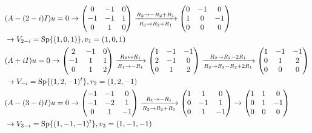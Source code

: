 \begin{align*}
	& (A - (2 - i) I) u = 0
	\rightarrow
	\begin{pmatrix}
		0 & -1 & 0 \\
		-1 & -1 & 1 \\
		0 & 1 & 0
	\end{pmatrix}
	\xrightarrow[R_3 \to R_3 + R_1]{R_2 \to -R_2 + R_1}
	\begin{pmatrix}
		0 & -1 & 0 \\
		1 & 0 & -1 \\
		0 & 0 & 0
	\end{pmatrix} \\
	& \rightarrow
	V_{2 -i} = \operatorname{Sp} \{ (1, 0, 1) \}, v_1 = (1, 0, 1) \\
	& (A + i I) u = 0
	\rightarrow
	\begin{pmatrix}
		2 & -1 & 0 \\
		-1 & 1 & 1 \\
		0 & 1 & 2
	\end{pmatrix}
	\xrightarrow[R_1 \to -R_1]{R_2 \leftrightarrow R_1}
	\begin{pmatrix}
		1 & -1 & -1 \\
		2 & -1 & 0 \\
		0 & 1 & 2
	\end{pmatrix}
	\xrightarrow[R_3 \to R_3 - R_2 + 2R_1]{R_2 \to R_2 - 2R_1}
	\begin{pmatrix}
		1 & -1 & -1 \\
		0 & 1 & 2 \\
		0 & 0 & 0
	\end{pmatrix} \\
	& \rightarrow
	V_{-i} = \operatorname{Sp}\{ (1, 2, -1)^t \}, v_2 = (1, 2, -1) \\
	& (A - (3 - i) I) u = 0
	\rightarrow
	\begin{pmatrix}
		-1 & -1 & 0 \\
		-1 & -2 & 1 \\
		0 & 1 & -1
	\end{pmatrix}
	\xrightarrow[R_2 \to R_2 + R_1]{R_1 \to - R_1}
	\begin{pmatrix}
		1 & 1 & 0 \\
		0 & -1 & 1 \\
		0 & 1 & -1
	\end{pmatrix}
	\rightarrow
	\begin{pmatrix}
		1 & 1 & 0 \\
		0 & 1 & -1 \\
		0 & 0 & 0
	\end{pmatrix} \\
	& \rightarrow V_{3 - i} = \operatorname{Sp}\{ (1, -1, -1)^t \}, v_3 = (1, -1, -1)
\end{align*}
